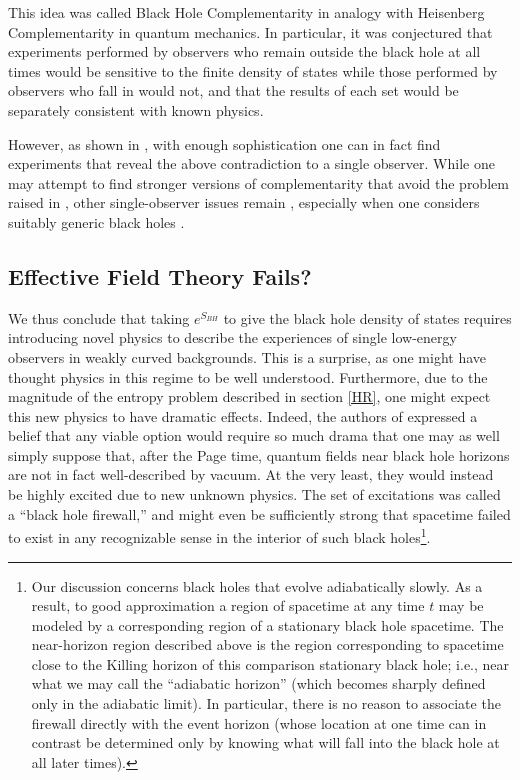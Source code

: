\documentclass[12pt]{article}
\begin{document}
This idea was called Black Hole Complementarity in analogy with Heisenberg Complementarity in quantum mechanics.  In particular, it was conjectured that experiments performed by observers who remain outside the black hole at all times would be sensitive to the finite density of states while those performed by observers who fall in would not, and that the results of each set would be separately consistent with known physics.

However, as shown in \cite{Almheiri:2012rt}, with enough sophistication one can in fact find experiments that reveal the above contradiction to a single observer.  While  one may attempt to find stronger versions of complementarity  \cite{Bousso:2012as,Harlow:2013tf} that avoid the problem raised in \cite{Almheiri:2012rt}, other single-observer issues remain \cite{Almheiri:2013hfa,Oppenheim:2014gfa}, especially when one considers suitably generic black holes \cite{BoussoTalk,Marolf:2013dba,Bousso:2013wia}.


\subsection{Effective Field Theory Fails?}
\label{EFTF}

We thus conclude that taking $e^{S_{BH}}$ to give the black hole density of states requires introducing novel physics to describe the experiences of single low-energy observers in weakly curved backgrounds.  This is a surprise, as one might have thought physics in this regime to be well understood.  Furthermore, due to the magnitude of the entropy problem described in section \ref{HR}, one might expect this new physics to have dramatic effects.  Indeed, the authors of \cite{Almheiri:2012rt} expressed a belief that any viable option would require so much drama that one may as well simply suppose that, after the Page time, quantum fields near black hole horizons are not in fact well-described by vacuum.  At the very least, they would instead be highly excited due to new unknown physics.  The set of excitations was called a ``black hole firewall,'' and might even be sufficiently strong that spacetime failed to exist in any recognizable sense in the interior of such black holes\footnote{Our discussion concerns black holes that evolve adiabatically slowly.  As a result, to good approximation a region of spacetime at any time $t$ may be modeled by a corresponding region of a stationary black hole spacetime.  The near-horizon region described above is the region corresponding to spacetime close to the Killing horizon of this comparison stationary black hole; i.e., near what we may call the ``adiabatic horizon'' (which becomes sharply defined only in the adiabatic limit).  In particular, there is no reason to associate the firewall directly with the event horizon (whose location at one time can in contrast be determined only by knowing what will fall into the black hole at all later times). }.
\end{document}
